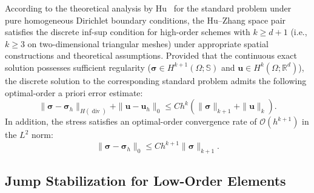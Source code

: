 According to the theoretical analysis by Hu~\cite{Hu2015} for the standard problem under pure homogeneous Dirichlet boundary conditions, the Hu--Zhang space pair satisfies the discrete inf-sup condition for high-order schemes with $k \ge d+1$ (i.e., $k \ge 3$ on two-dimensional triangular meshes) under appropriate spatial constructions and theoretical assumptions. Provided that the continuous exact solution possesses sufficient regularity ($\boldsymbol{\sigma} \in H^{k+1}(\Omega;\mathbb{S})$ and $\boldsymbol{u} \in H^k(\Omega;\mathbb{R}^d)$), the discrete solution to the corresponding standard problem admits the following optimal-order a priori error estimate:
\begin{equation}
\label{eq:optimal_error_estimate_hdiv}
\|\boldsymbol{\sigma} - \boldsymbol{\sigma}_h\|_{H(\operatorname{div})} + \|\boldsymbol{u} - \boldsymbol{u}_h\|_0 \le C h^k \left( \|\boldsymbol{\sigma}\|_{k+1} + \|\boldsymbol{u}\|_k \right).
\end{equation}
In addition, the stress satisfies an optimal-order convergence rate of $\mathcal{O}(h^{k+1})$ in the $L^2$ norm:
\begin{equation}
\label{eq:optimal_error_estimate_l2}
\|\boldsymbol{\sigma} - \boldsymbol{\sigma}_h\|_0 \le C h^{k+1} \|\boldsymbol{\sigma}\|_{k+1}.
\end{equation}


\subsection{Jump Stabilization for Low-Order Elements}
\label{subsec:jump_stabilization}

